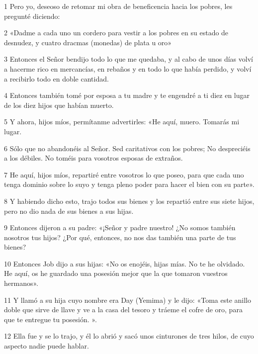 \par 1 Pero yo, deseoso de retomar mi obra de beneficencia hacia los pobres, les pregunté diciendo:

\par 2 «Dadme a cada uno un cordero para vestir a los pobres en su estado de desnudez, y cuatro dracmas (monedas) de plata u oro»

\par 3 Entonces el Señor bendijo todo lo que me quedaba, y al cabo de unos días volví a hacerme rico en mercancías, en rebaños y en todo lo que había perdido, y volví a recibirlo todo en doble cantidad.

\par 4 Entonces también tomé por esposa a tu madre y te engendré a ti diez en lugar de los diez hijos que habían muerto.

\par 5 Y ahora, hijos míos, permítanme advertirles: «He aquí, muero. Tomarás mi lugar.

\par 6 Sólo que no abandonéis al Señor. Sed caritativos con los pobres; No despreciéis a los débiles. No toméis para vosotros esposas de extraños.

\par 7 He aquí, hijos míos, repartiré entre vosotros lo que poseo, para que cada uno tenga dominio sobre lo suyo y tenga pleno poder para hacer el bien con su parte».

\par 8 Y habiendo dicho esto, trajo todos sus bienes y los repartió entre sus siete hijos, pero no dio nada de sus bienes a sus hijas.

\par 9 Entonces dijeron a su padre: «¡Señor y padre nuestro! ¿No somos también nosotros tus hijos? ¿Por qué, entonces, no nos das también una parte de tus bienes?

\par 10 Entonces Job dijo a sus hijas: «No os enojéis, hijas mías. No te he olvidado. He aquí, os he guardado una posesión mejor que la que tomaron vuestros hermanos».

\par 11 Y llamó a su hija cuyo nombre era Day (Yemima) y le dijo: «Toma este anillo doble que sirve de llave y ve a la casa del tesoro y tráeme el cofre de oro, para que te entregue tu posesión. ».

\par 12 Ella fue y se lo trajo, y él lo abrió y sacó unos cinturones de tres hilos, de cuyo aspecto nadie puede hablar.

